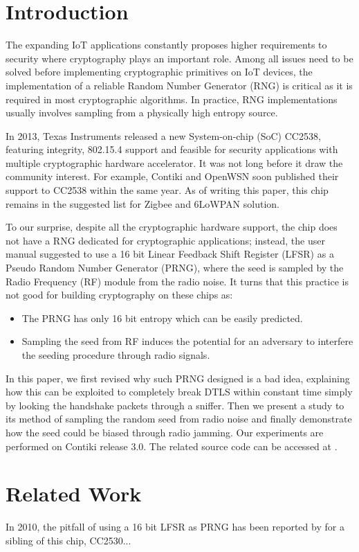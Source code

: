 \section{Introduction}
The expanding IoT applications constantly proposes higher requirements to security where cryptography plays an important role. Among all issues need to be solved before implementing cryptographic primitives on IoT devices, the implementation of a reliable Random Number Generator (RNG) is critical as it is required in most cryptographic algorithms. In practice, RNG implementations usually involves sampling from a physically high entropy source.

In 2013, Texas Instruments released a new System-on-chip (SoC)  CC2538\cite{CC2538}, featuring integrity, 802.15.4 support and feasible for security applications with multiple cryptographic hardware accelerator. It was not long before it draw the community interest. For example, Contiki and OpenWSN soon published their support to CC2538 within the same year. As of writing this paper, this chip remains in the suggested list for Zigbee and 6LoWPAN solution.

To our surprise, despite all the cryptographic hardware support, the chip does not have a RNG dedicated for cryptographic applications; instead, the user manual suggested to use a 16 bit Linear Feedback Shift Register (LFSR) as a Pseudo Random Number Generator (PRNG), where the seed is sampled by the Radio Frequency (RF) module from the radio noise. It turns that this practice is not good for building cryptography on these chips as:
\begin{itemize}
	\item The PRNG has only 16 bit entropy which can be easily predicted.
	\item Sampling the seed from RF induces the potential for an adversary to interfere the seeding procedure through radio signals.
\end{itemize}

In this paper, we first revised why such PRNG designed is a bad idea, explaining how this can be exploited to completely break DTLS within constant time simply by looking the handshake packets through a sniffer. Then we present a study to its method of sampling the random seed from radio noise and finally demonstrate how the seed could be biased through radio jamming. Our experiments are performed on Contiki release 3.0. The related source code can be accessed at \cite{prngtest}.

\section{Related Work}
In 2010, the pitfall of using a 16 bit LFSR as PRNG has been reported by \cite{SmartMeterBlog}\cite{CC2530PRNG} for a sibling of this chip, CC2530...

